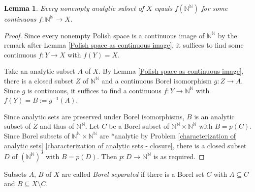 \documentclass[10pt]{amsart}
\newcommand{\NN}{\mathbb{N}}
\newtheorem{lemma}[theorem]{Lemma}
\theoremstyle{definition}
\theoremstyle{remark}
\begin{document}
\begin{lemma} \label{analytic sets as continuous images of N^N} 
Every nonempty analytic subset of $X$ equals $f(\NN^\NN)$ for some continuous $f\colon \NN^\NN\rightarrow X$. 
\end{lemma} 
\begin{proof} 
Since every nonempty Polish space is a continuous image of $\NN^\NN$ by the remark after Lemma \ref{Polish space as continuous image}, it suffices to find some continuous $f\colon Y\rightarrow X$ with $f(Y)=X$. 

Take an analytic subset $A$ of $X$. By Lemma \ref{Polish space as continuous image}, there is a closed subset $Z$ of $\NN^\NN$ and a continuous Borel isomorphism $g\colon Z\rightarrow A$. 
Since $g$ is continuous, it suffices to find a continuous $f\colon Y\rightarrow \NN^\NN$ with $f(Y)=B:=g^{-1}(A)$. 

Since analytic sets are preserved under Borel isomorphisms, $B$ is an analytic subset of $Z$ and thus of $\NN^\NN$. 
Let $C$ be a Borel subset of $\NN^\NN\times \NN^\NN$ with $B=p(C)$. 
Since Borel subsets of $\NN^\NN\times \NN^\NN$ are *analytic by Problem \ref{characterization of analytic sets} \ref{characterization of analytic sets - closure}, there is a closed subset $D$ of $(\NN^\NN)^3$ with $B=p(D)$. 
Then $p\colon D\rightarrow \NN^\NN$ is as required. 
\end{proof} 

Subsets $A$, $B$ of $X$ are called \emph{Borel separated} if there is a Borel set $C$ with $A\subseteq C$ and $B\subseteq X\setminus C$. 
\end{document}
